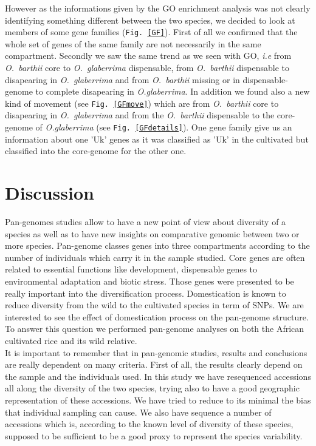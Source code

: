 \documentclass[10pt,letterpaper]{article}
\begin{document}
However as the informations given by the GO enrichment analysis was not clearly identifying something different between the two species, we decided to look at members of some gene families (\texttt{Fig. \ref{GF}}).
First of all we confirmed that the whole set of genes of the same family are not 
necessarily in the same compartment. Secondly we saw the same trend as we seen with GO, \textit{i.e} from 
\emph{O.~barthii} core to \emph{O.~glaberrima} dispensable, from \emph{O.~barthii} dispensable to disapearing in \emph{O.~glaberrima} and from \emph{O.~barthii} missing or in dispensable-genome to complete disapearing in \emph{O.glaberrima}. 
In addition we found also a new kind of movement (see \texttt{Fig.~\ref{GFmove}}) which are from \emph{O.~barthii} core to disapearing in \emph{O.~glaberrima} and from the \emph{O.~barthii} dispensable to the 
core-genome of \emph{O.glaberrima} (see \texttt{Fig.~\ref{GFdetails}}). 
One gene family give us an information about one 'Uk' genes as it was classified as 'Uk' in the cultivated but classified into the core-genome for the other one.


\section*{Discussion}
Pan-genomes studies allow to have a new point of view about diversity of a species as well as to have new insights on comparative genomic between two or more species. Pan-genome classes genes into three compartments
according to the number of individuals which carry it in the sample studied. Core genes are often related to essential functions like development, dispensable genes to environmental adaptation and biotic stress. Those 
genes were presented to be really important into the diversification process. 
Domestication is known to reduce diversity from the wild to the cultivated species in term of SNPs. We are interested to see the effect of domestication process on the pan-genome structure. To answer this question we performed
pan-genome analyses on both the African cultivated rice and its wild relative.\\

It is important to remember that in pan-genomic studies, results and conclusions are really dependent on many criteria. First of all, the results clearly depend on the sample and the individuals used. In this study we have resequenced accessions all along the diversity of the two species, trying also to have a good geographic representation of these accessions. We have tried to reduce to its minimal the bias that individual sampling can cause. We also have sequence a number of accessions which is, according to the known level of diversity of these species, supposed to be sufficient to be a good proxy to represent the species variability.
\end{document}
